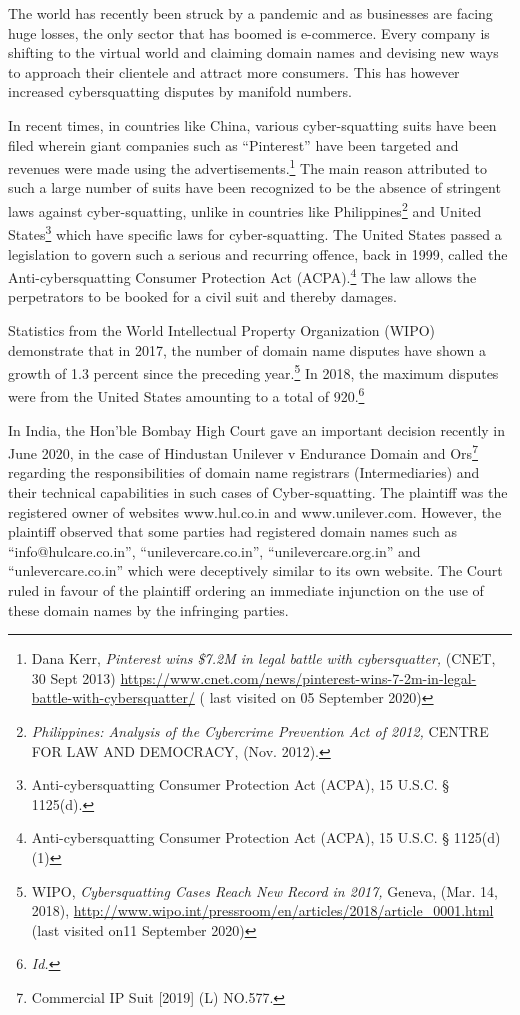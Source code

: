 \begin{multicols}{2}

\noi
The world has recently been struck by a pandemic and as businesses are facing huge losses,
the only sector that has boomed is e-commerce. Every company is shifting to the virtual
world and claiming domain names and devising new ways to approach their clientele and
attract more consumers. This has however increased cybersquatting disputes by manifold
numbers.

\noi
In recent times, in countries like China, various cyber-squatting suits have been filed wherein
giant companies such as “Pinterest” have been targeted and revenues were made using the
advertisements.\footnote{Dana Kerr, \textit{Pinterest wins \$7.2M in legal battle with cybersquatter,} (CNET, 30 Sept 2013) \url{https://www.cnet.com/news/pinterest-wins-7-2m-in-legal-battle-with-cybersquatter/} ( last visited on 05 September 2020)} The main reason attributed to such a large number of suits have been
recognized to be the absence of stringent laws against cyber-squatting, unlike in countries
like Philippines\footnote{\textit{Philippines: Analysis of the Cybercrime Prevention Act of 2012,} CENTRE FOR LAW AND DEMOCRACY, (Nov. 2012).} and United States\footnote{Anti-cybersquatting Consumer Protection Act (ACPA), 15 U.S.C. § 1125(d).} which have specific laws for cyber-squatting. The
United States passed a legislation to govern such a serious and recurring offence, back in
1999, called the Anti-cybersquatting Consumer Protection Act (ACPA).\footnote{Anti-cybersquatting Consumer Protection Act (ACPA), 15 U.S.C. § 1125(d) (1)} The law allows the
perpetrators to be booked for a civil suit and thereby damages.

\noi
Statistics from the World Intellectual Property Organization (WIPO) demonstrate that in
2017, the number of domain name disputes have shown a growth of 1.3 percent since the
preceding year.\footnote{WIPO, \textit{Cybersquatting Cases Reach New Record in 2017,} Geneva, (Mar. 14, 2018), \url{http://www.wipo.int/pressroom/en/articles/2018/article_0001.html} (last visited on11 September 2020)} In 2018, the maximum disputes were from the United States amounting to a
total of 920.\footnote{\textit{Id.}}

\noi
In India, the Hon’ble Bombay High Court gave an important decision recently in June 2020,
in the case of Hindustan Unilever v Endurance Domain and Ors\footnote{Commercial IP Suit [2019] (L) NO.577.} regarding the responsibilities of domain name registrars (Intermediaries) and their technical capabilities in
such cases of Cyber-squatting. The plaintiff was the registered owner of websites
www.hul.co.in and www.unilever.com. However, the plaintiff observed that some parties had
registered domain names such as “info@hulcare.co.in”, “unilevercare.co.in”,
“unilevercare.org.in” and “unlevercare.co.in” which were deceptively similar to its own
website. The Court ruled in favour of the plaintiff ordering an immediate injunction on the
use of these domain names by the infringing parties.


\end{multicols}

